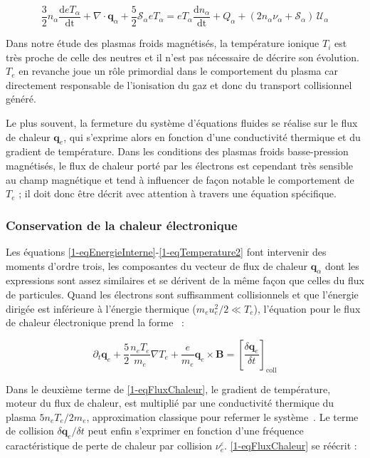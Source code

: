 \begin{refsection}
\begin{equation}
\label{1-eqTemperature2}
\frac{3}{2}n_\alpha\frac{\text{d}eT_\alpha}{\text{dt}}+\nabla\cdot\mathbf
q_\alpha + \frac{5}{2}\mathcal{S}_\alpha eT_\alpha =
eT_\alpha\frac{\text{d}n_\alpha}{\text{dt}}+
{Q_\alpha}+(2n_\alpha\nu_\alpha+\mathcal{S}_\alpha)\,\mathcal{U}_\alpha
\end{equation}

Dans notre étude des plasmas froids magnétisés, la température ionique $T_i$
est très proche de celle des neutres et il n'est pas nécessaire de décrire
son évolution. $T_e$ en revanche joue un rôle primordial dans le comportement
du plasma car directement responsable de l'ionisation du gaz et donc du
transport collisionnel généré. 

Le plus souvent, la fermeture du système d'équations fluides se réalise sur le
flux de chaleur $\mathbf q_e$, qui s'exprime alors en fonction d'une
conductivité thermique et du gradient de température. Dans les conditions des plasmas froids
basse-pression magnétisés, le flux de chaleur porté par les électrons est
cependant très sensible au champ magnétique et tend à influencer de façon
notable le comportement de $T_e$ ; il doit donc être décrit avec attention à
travers une équation spécifique.

\subsubsection{Conservation de la chaleur électronique}

Les équations \eqref{1-eqEnergieInterne}-\eqref{1-eqTemperature2} font
intervenir des moments d'ordre trois, les composantes du vecteur de flux de
chaleur $\mathbf q_\alpha$ dont les expressions sont assez similaires et se
dérivent de la même façon que celles du flux de particules. Quand les électrons
sont suffisamment collisionnels et que l'énergie dirigée est inférieure à
l'énergie thermique ($m_eu_e^2/2\ll T_e$), l'équation pour le flux de chaleur
électronique prend la forme~\parencite{Golant} :

\begin{equation}
\label{1-eqFluxChaleur}
\partial_t\mathbf
q_e+\frac{5}{2}\frac{n_e
T_e}{m_e}\nabla T_e+\frac{e}{m_e} \mathbf
q_e\times\mathbf B=\left[\frac{\delta\mathbf q_e}{\delta t}\right]_\text{coll}
\end{equation}

Dans le deuxième terme de \eqref{1-eqFluxChaleur}, le
gradient de température, moteur du flux de chaleur, est multiplié par une
conductivité thermique du plasma $5n_eT_e/2m_e$, approximation classique pour
refermer le système~\parencite{bittencourt}. Le terme de collision
$\delta\mathbf q_e/\delta t$ peut enfin s'exprimer en fonction d'une fréquence
caractéristique de perte de chaleur par collision $\nu_{e}^\varepsilon$.
\eqref{1-eqFluxChaleur} se réécrit :


\end{refsection}
